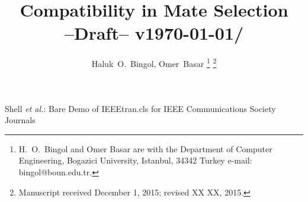 \documentclass[journal,comsoc]{IEEEtran}
\newcommand{\hbNow}{--Draft-- v\today/\currenttime} %
\begin{document}
%
\title{
	Compatibility in Mate Selection
	{\small \\ \hbNow}  %
}
%
%
%

\author{Haluk~O.~Bingol,
        Omer~Basar%
\thanks{
H.~O.~Bingol  and Omer Basar are with 
the Department of Computer Engineering, 
Bogazici University, 
Istanbul,
34342 Turkey 
e-mail: bingol@boun.edu.tr.
}%
\thanks{Manuscript received December 1, 2015; revised XX XX, 2015.}}

% 
%



%
{Shell \MakeLowercase{\textit{et al.}}: Bare Demo of IEEEtran.cls for IEEE Communications Society Journals}
% 
\end{document}
